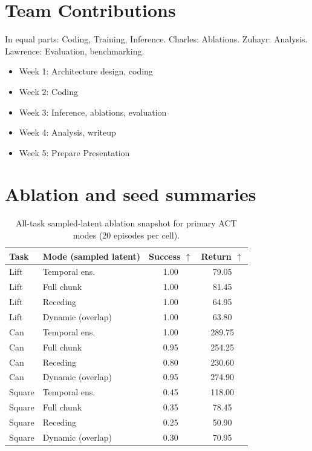 \documentclass{article}
\begin{document}
\section{Team Contributions}
In equal parts: Coding, Training, Inference. 
Charles: Ablations. 
Zuhayr: Analysis. 
Lawrence: Evaluation, benchmarking. 

\begin{itemize}
    \item Week 1: Architecture design, coding
    \item Week 2: Coding
    \item Week 3: Inference, ablations, evaluation
    \item Week 4: Analysis, writeup
    \item Week 5: Prepare Presentation
\end{itemize}


\appendix

\section{Ablation and seed summaries}

\begin{table}[H]
\centering
\small
\begin{tabular}{@{}llcc@{}}
\toprule
Task & Mode (sampled latent) & Success $\uparrow$ & Return $\uparrow$ \\
\midrule
Lift & Temporal ens. & 1.00 & 79.05 \\
Lift & Full chunk & 1.00 & 81.45 \\
Lift & Receding & 1.00 & 64.95 \\
Lift & Dynamic (overlap) & 1.00 & 63.80 \\
\midrule
Can & Temporal ens. & 1.00 & 289.75 \\
Can & Full chunk & 0.95 & 254.25 \\
Can & Receding & 0.80 & 230.60 \\
Can & Dynamic (overlap) & 0.95 & 274.90 \\
\midrule
Square & Temporal ens. & 0.45 & 118.00 \\
Square & Full chunk & 0.35 & 78.45 \\
Square & Receding & 0.25 & 50.90 \\
Square & Dynamic (overlap) & 0.30 & 70.95 \\
\bottomrule
\end{tabular}
\caption{All-task sampled-latent ablation snapshot for primary ACT modes ($20$ episodes per cell).}
\label{tab:abl_sampled_all_tasks}
\end{table}
\end{document}
